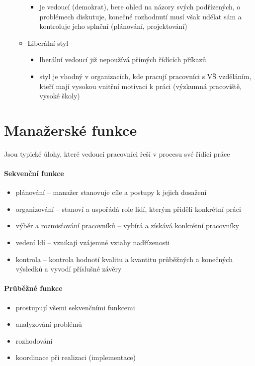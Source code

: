 \begin{enumerate}
\begin{itemize}
\begin{itemize}
                    \item je vedoucí (demokrat), bere ohled na názory svých podřízených, o problémech diskutuje, konečné rozhodnutí musí však udělat sám a kontroluje jeho splnění (plánování, projektování)
                \end{itemize}
            \item Liberální styl
                \begin{itemize}
                    \item lberální vedoucí již nepoužívá přímých řídících příkazů
                    \item styl je vhodný v organizacích, kde pracují pracovníci s VŠ vzděláním, kteří mají vysokou vnitřní motivaci k práci (výzkumná pracoviště, vysoké školy)
                \end{itemize}
        \end{itemize}
\end{enumerate}

\section*{Manažerské funkce}
Jsou typické úlohy, které vedoucí pracovníci řeší v procesu své řídící práce

\paragraph*{Sekvenční funkce}
\begin{itemize}
    \item plánování -- manažer stanovuje cíle a postupy k jejich dosažení
    \item organizování -- stanoví a uspořádá role lidí, kterým přidělí konkrétní práci
    \item výběr a rozmisťování pracovníků -- vybírá a získává konkrétní pracovníky
    \item vedení ldí -- vznikají vzájemné vztahy nadřízenosti
    \item kontrola -- kontrola hodnotí kvalitu a kvantitu průběžných a konečných výsledků a vyvodí příslušné závěry
\end{itemize}

\paragraph{Průběžné funkce}
\begin{itemize}
    \item prostupují všemi sekvenčními funkcemi
    \item analyzování problémů
    \item rozhodování
    \item koordinace při realizaci (implementace)
\end{itemize}

